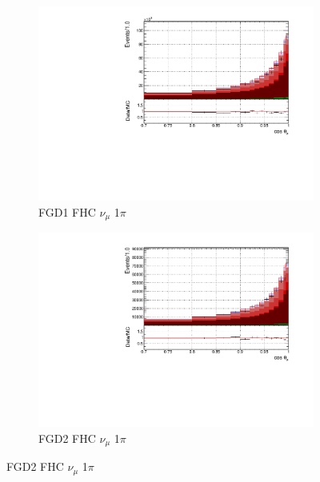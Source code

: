 \begin{figure}[!h]
\begin{subfigure}{0.49\textwidth}
  \centering
  \includegraphics[width=\textwidth]{figs/FGD1_numuCC_1pi_t}
  \caption{FGD1 FHC $\nu_{\mu}$ 1$\pi$}
\end{subfigure}
\centering
\begin{subfigure}{0.49\textwidth}
  \centering
  \includegraphics[width=\textwidth]{figs/FGD2_numuCC_1pi_t}
  \caption{FGD2 FHC $\nu_{\mu}$ 1$\pi$}
\end{subfigure}


\end{figure}
